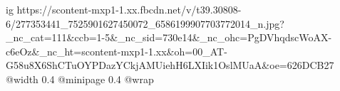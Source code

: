  
 
 
 
 

\ifcmt
  ig https://scontent-mxp1-1.xx.fbcdn.net/v/t39.30808-6/277353441_7525901627450072_6586199907703772014_n.jpg?_nc_cat=111&ccb=1-5&_nc_sid=730e14&_nc_ohc=PgDVhqdscWoAX-c6eOz&_nc_ht=scontent-mxp1-1.xx&oh=00_AT-G58u8X6ShCTuOYPDazYCkjAMUiehH6LXIik1OslMUaA&oe=626DCB27
  @width 0.4
  @minipage 0.4
  @wrap \parpic[r]
\fi
